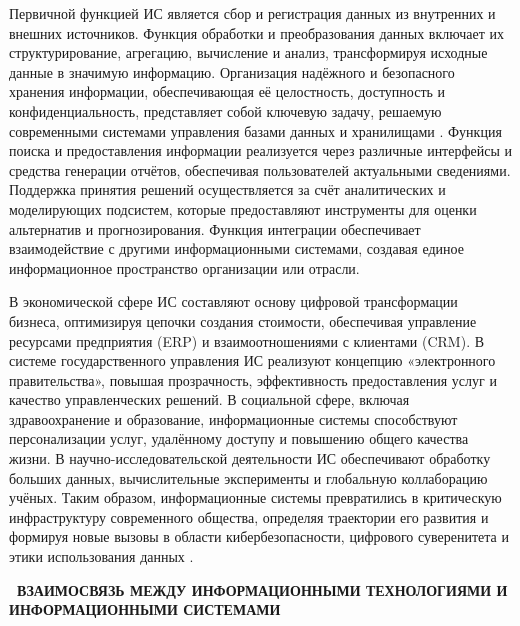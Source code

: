 \documentclass{SibFU-docs}
\begin{document}

Первичной функцией ИС является сбор и регистрация данных из внутренних и внешних источников. Функция обработки и преобразования данных включает их структурирование, агрегацию, вычисление и анализ, трансформируя исходные данные в значимую информацию. Организация надёжного и безопасного хранения информации, обеспечивающая её целостность, доступность и конфиденциальность, представляет собой ключевую задачу, решаемую современными системами управления базами данных и хранилищами \cite{nist_cybersecurity_framework_2018}. Функция поиска и предоставления информации реализуется через различные интерфейсы и средства генерации отчётов, обеспечивая пользователей актуальными сведениями. Поддержка принятия решений осуществляется за счёт аналитических и моделирующих подсистем, которые предоставляют инструменты для оценки альтернатив и прогнозирования. Функция интеграции обеспечивает взаимодействие с другими информационными системами, создавая единое информационное пространство организации или отрасли.


В экономической сфере ИС составляют основу цифровой трансформации бизнеса, оптимизируя цепочки создания стоимости, обеспечивая управление ресурсами предприятия (ERP) и взаимоотношениями с клиентами (CRM). В системе государственного управления ИС реализуют концепцию «электронного правительства», повышая прозрачность, эффективность предоставления услуг и качество управленческих решений. В социальной сфере, включая здравоохранение и образование, информационные системы способствуют персонализации услуг, удалённому доступу и повышению общего качества жизни. В научно-исследовательской деятельности ИС обеспечивают обработку больших данных, вычислительные эксперименты и глобальную коллаборацию учёных. Таким образом, информационные системы превратились в критическую инфраструктуру современного общества, определяя траектории его развития и формируя новые вызовы в области кибербезопасности, цифрового суверенитета и этики использования данных \cite{oecd_digital_economy_2019}.

\newpage
{}
\vspace*{-1.5em}
\begin{center}\textbf{\thesection\ ВЗАИМОСВЯЗЬ МЕЖДУ ИНФОРМАЦИОННЫМИ ТЕХНОЛОГИЯМИ И ИНФОРМАЦИОННЫМИ СИСТЕМАМИ}\end{center}
\vspace*{-1.5em}
\end{document}
